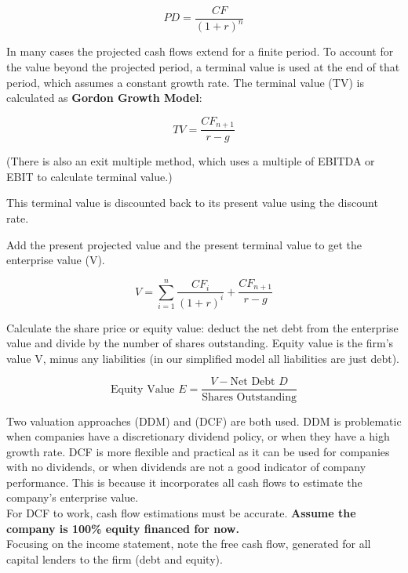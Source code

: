 \begin{equation}
    PD  = \frac{CF}{(1+r)^n}
\end{equation}

In many cases the projected cash flows extend for a finite period. To account for the value beyond the projected period, a terminal value is used at the end of that period, which assumes a constant growth rate. The terminal value (TV) is calculated as \textbf{Gordon Growth Model}:

\begin{equation}
    TV = \frac{CF_{n+1}}{r-g}
\end{equation}

(There is also an exit multiple method, which uses a multiple of EBITDA or EBIT to calculate terminal value.)

This terminal value is discounted back to its present value using the discount rate. 

Add the present projected value and the present terminal value to get the enterprise value (V).

\begin{equation}
    V = \sum_{i=1}^{n} \frac{CF_i}{(1+r)^i} + \frac{CF_{n+1}}{r-g}
\end{equation}

Calculate the share price or equity value: deduct the net debt from the enterprise value and divide by the number of shares outstanding. Equity value is the firm's value V, minus any liabilities (in our simplified model all liabilities are just debt).

\begin{equation}
    \text{Equity Value } E = \frac{V - \text{Net Debt } D}{\text{Shares Outstanding}}
\end{equation}

Two valuation approaches (DDM) and (DCF) are both used. DDM is problematic when companies have a discretionary dividend policy, or when they have a high growth rate. DCF is more flexible and practical as it can be used for companies with no dividends, or when dividends are not a good indicator of company performance. This is because it incorporates all cash flows to estimate the company's enterprise value.\\

For DCF to work, cash flow estimations must be accurate. \textbf{Assume the company is 100\% equity financed for now.} \\

Focusing on the income statement, note the free cash flow, generated for all capital lenders to the firm (debt and equity). 

